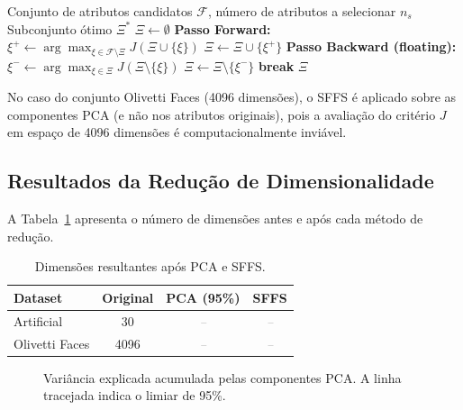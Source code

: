 \documentclass[12pt, a4paper]{article}
\newcommand{\placeholder}[1]{\textcolor{gray}{\textit{#1}}}
\begin{document}
\begin{algorithm}[H]
\caption{Sequential Floating Forward Selection (SFFS)}
\label{alg:sffs}
\begin{algorithmic}[1]
\Require Conjunto de atributos candidatos $\mathcal{F}$, número de atributos a selecionar $n_s$
\Ensure Subconjunto ótimo $\Xi^*$
\State $\Xi \leftarrow \emptyset$
    \State \textbf{Passo Forward:} $\xi^+ \leftarrow \arg\max_{\xi \in \mathcal{F} \setminus \Xi} J(\Xi \cup \{\xi\})$
    \State $\Xi \leftarrow \Xi \cup \{\xi^+\}$
    \State \textbf{Passo Backward (floating):}
        \State $\xi^- \leftarrow \arg\max_{\xi \in \Xi} J(\Xi \setminus \{\xi\})$
            \State $\Xi \leftarrow \Xi \setminus \{\xi^-\}$
        \Else
            \State \textbf{break}
        \EndIf
    \EndWhile
\EndWhile
\State \Return $\Xi$
\end{algorithmic}
\end{algorithm}

No caso do conjunto Olivetti Faces (4096 dimensões), o SFFS é aplicado sobre as componentes PCA (e não nos atributos originais), pois a avaliação do critério $J$ em espaço de 4096 dimensões é computacionalmente inviável.

\subsection{Resultados da Redução de Dimensionalidade}
\label{sec:res_reducao}

A Tabela~\ref{tab:reducao} apresenta o número de dimensões antes e após cada método de redução.

\begin{table}[H]
    \centering
    \caption{Dimensões resultantes após PCA e SFFS.}
    \label{tab:reducao}
    \begin{tabular}{lccc}
        \toprule
        \textbf{Dataset} & \textbf{Original} & \textbf{PCA (95\%)} & \textbf{SFFS} \\
        \midrule
        Artificial       & 30     & \placeholder{--}  & \placeholder{--} \\
        Olivetti Faces   & 4096   & \placeholder{--}  & \placeholder{--} \\
        \bottomrule
    \end{tabular}
\end{table}

\begin{figure}[H]
    \centering
    \hfill
    \caption{Variância explicada acumulada pelas componentes PCA. A linha tracejada indica o limiar de 95\%.}
    \label{fig:pca_var}
\end{figure}
\end{document}
